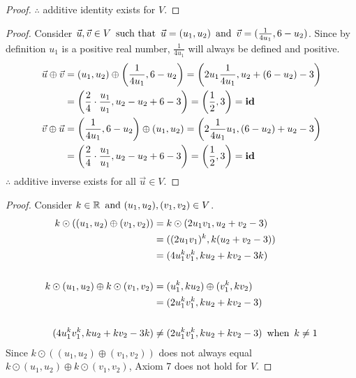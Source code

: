 \documentclass{article}
\begin{document}
\begin{enumerate}
\begin{proof}
        $\therefore$ additive identity exists for $V$.
    \end{proof}
    \begin{proof}
        Consider $\vec{u}, \vec{v} \in V \operatorname{~\text{such that}~} \vec{u} = (u_1, u_2) \operatorname{~\text{and}~} \vec{v} = (\frac{1}{4u_1},6-u_2)$. Since by definition $u_1$ is a positive real number, $\frac{1}{4u_1}$ will always be defined and positive.
        \begin{align*}
            \vec{u} \oplus \vec{v} & = (u_1, u_2) \oplus \left(\frac{1}{4u_1}, 6-u_2\right) = \left(2u_1\frac{1}{4u_1}, u_2 + (6 - u_2) - 3\right) \\
                                   & = \left(\frac{2}{4}\cdot\frac{u_1}{u_1}, u_2 - u_2 + 6 - 3\right) = \left(\frac{1}{2}, 3\right) = \operatorname{\textbf{id}}         \\
            \vec{v} \oplus \vec{u} & = \left(\frac{1}{4u_1}, 6-u_2\right) \oplus (u_1, u_2) = \left(2\frac{1}{4u_1}u_1, (6 - u_2) + u_2 - 3\right) \\
                                   & = \left(\frac{2}{4}\cdot\frac{u_1}{u_1}, u_2 - u_2 + 6 - 3\right) = \left(\frac{1}{2}, 3\right) = \operatorname{\textbf{id}}
        \end{align*}
        $\therefore$ additive inverse exists for all $\vec{u} \in V$.
    \end{proof}
    \begin{proof}
        Consider $k \in \mathbb{R} \operatorname{~\text{and}~} (u_1,u_2), (v_1,v_2) \in V$.
        \begin{align*}
            k \odot ((u_1,u_2) \oplus (v_1, v_2))       & = k \odot (2u_1v_1, u_2+v_2-3)                 \\
                                                        & = ((2u_1v_1)^k,k(u_2+v_2-3))                   \\
                                                        & = (4u_1^kv_1^k,ku_2+kv_2-3k)                   \\ \\
            k \odot (u_1,u_2) \oplus k \odot (v_1, v_2) & = (u_1^k,ku_2) \oplus (v_1^k,kv_2)             \\
                                                        & = (2u_1^kv_1^k,ku_2+kv_2-3)                    \\ \\
            (4u_1^kv_1^k,ku_2+kv_2-3k)                  & \neq (2u_1^kv_1^k,ku_2+kv_2-3) \operatorname{~\text{when}~} k \neq 1
        \end{align*}
        Since $k \odot ((u_1,u_2) \oplus (v_1, v_2))$ does not always equal $k \odot (u_1,u_2) \oplus k \odot (v_1, v_2)$, Axiom 7 does not hold for $V$.
    \end{proof}
\end{enumerate}
\newpage
\end{document}
